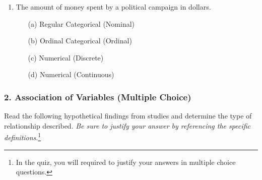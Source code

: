 \documentclass{article}
\begin{document}
\begin{enumerate}
    \item The amount of money spent by a political campaign in dollars.
    \begin{itemize}
        \item[(a)] Regular Categorical (Nominal)
        \item[(b)] Ordinal Categorical (Ordinal)
        \item[(c)] Numerical (Discrete)
        \item[(d)] Numerical (Continuous)
    \end{itemize}

\end{enumerate}

\subsubsection*{2. Association of Variables (Multiple Choice)}
Read the following hypothetical findings from studies and determine the type of relationship described. \emph{Be sure to justify your answer by referencing the specific definitions}.\footnote{In the quiz, you will required to justify your answers in multiple choice questions.}
\end{document}
